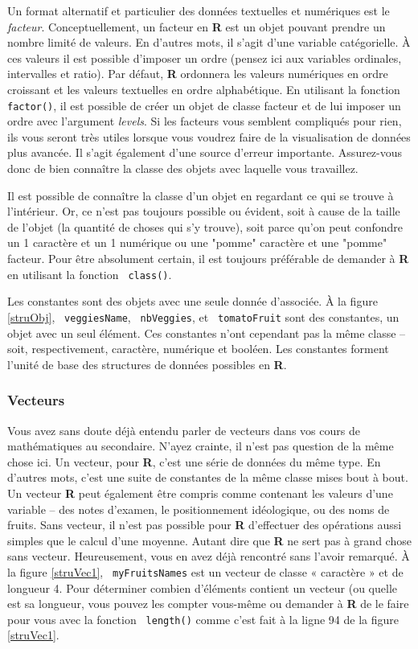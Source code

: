 \documentclass[10.5pt,a4paper]{article}
\newcommand{\rcode}[1]{\texttt{\color{rstudio} #1}}
\begin{document}
    Un format alternatif et particulier des données textuelles et numériques est le \emph{facteur}. Conceptuellement, un facteur en \textbf{R} est un objet pouvant prendre un nombre limité de valeurs. En d'autres mots, il s'agit d'une variable catégorielle. À ces valeurs il est possible d'imposer un ordre (pensez ici aux variables ordinales, intervalles et ratio). Par défaut, \textbf{R} ordonnera les valeurs numériques en ordre croissant et les valeurs textuelles en ordre alphabétique. En utilisant la fonction \rcode{factor()}, il est possible de créer un objet de classe facteur et de lui imposer un ordre avec l'argument \emph{levels}. Si les facteurs vous semblent compliqués pour rien, ils vous seront très utiles lorsque vous voudrez faire de la visualisation de données plus avancée. Il s'agit également d'une source d'erreur importante. Assurez-vous donc de bien connaître la classe des objets avec laquelle vous travaillez.
    
    Il est possible de connaître la classe d'un objet en regardant ce qui se trouve à l'intérieur. Or, ce n'est pas toujours possible ou évident, soit à cause de la taille de l'objet (la quantité de choses qui s'y trouve), soit parce qu'on peut confondre un 1 caractère et un 1 numérique ou une "pomme" caractère et une "pomme" facteur. Pour être absolument certain, il est toujours préférable de demander à \textbf{R} en utilisant la fonction \rcode{class()}.
    
    Les constantes sont des objets avec une seule donnée d'associée. À la figure \ref{struObj}, \rcode{veggiesName}, \rcode{nbVeggies}, et \rcode{tomatoFruit} sont des constantes, un objet avec un seul élément. Ces constantes n'ont cependant pas la même classe -- soit, respectivement, caractère, numérique et booléen. Les constantes forment l'unité de base des structures de données possibles en \textbf{R}.
    
    \subsubsection{Vecteurs}\label{vec}
    Vous avez sans doute déjà entendu parler de vecteurs dans vos cours de mathématiques au secondaire. N'ayez crainte, il n'est pas question de la même chose ici. Un vecteur, pour \textbf{R}, c'est une série de données du même type. En d'autres mots, c'est une suite de constantes de la même classe mises bout à bout. Un vecteur \textbf{R} peut également être compris comme contenant les valeurs d'une variable -- des notes d'examen, le positionnement idéologique, ou des noms de fruits. Sans vecteur, il n'est pas possible pour \textbf{R} d'effectuer des opérations aussi simples que le calcul d'une moyenne. Autant dire que \textbf{R} ne sert pas à grand chose sans vecteur. Heureusement, vous en avez déjà rencontré sans l'avoir remarqué. À la figure \ref{struVec1}, \rcode{myFruitsNames} est un vecteur de classe « caractère » et de longueur 4. Pour déterminer combien d'éléments contient un vecteur (ou quelle est sa longueur, vous pouvez les compter vous-même ou demander à \textbf{R} de le faire pour vous avec la fonction \rcode{length()} comme c'est fait à la ligne 94 de la figure \ref{struVec1}. 
    
\end{document}

